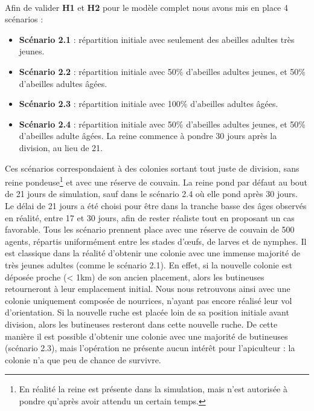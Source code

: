 			\paragraph{}
			
			Afin de valider \textbf{H1} et \textbf{H2} pour le modèle complet nous avons mis en place 4 scénarios :			
			\begin{itemize}
					\item \textbf{Scénario 2.1} : répartition initiale avec seulement des abeilles adultes très jeunes.
					\item \textbf{Scénario 2.2} : répartition initiale avec 50\% d'abeilles adultes jeunes, et 50\% d'abeilles adultes âgées.
					\item \textbf{Scénario 2.3} : répartition initiale avec 100\% d'abeilles adultes âgées.
					\item \textbf{Scénario 2.4} : répartition initiale avec 50\% d'abeilles adultes jeunes, et 50\% d'abeilles adulte âgées. La reine commence à pondre 30 jours après la division, au lieu de 21.
			\end{itemize}
			
			Ces scénarios correspondaient à des colonies sortant tout juste de division, sans reine pondeuse\footnote{En réalité la reine est présente dans la simulation, mais n'est autorisée à pondre qu'après avoir attendu un certain temps.} et avec une réserve de couvain. La reine pond par défaut au bout de 21 jours de simulation, sauf dans le scénario 2.4 où elle pond après 30 jours. Le délai de 21 jours a été choisi pour être dans la tranche basse des âges observés en réalité, entre 17 et 30 jours, afin de rester réaliste tout en proposant un cas favorable. Tous les scénario prennent place avec une réserve de couvain de 500 agents, répartis uniformément entre les stades d'œufs, de larves et de nymphes. Il est classique dans la réalité d'obtenir une colonie avec une immense majorité de très jeunes adultes (comme le scénario 2.1). En effet, si la nouvelle colonie est déposée proche (< 1km) de son ancien placement, alors les butineuses retourneront à leur emplacement initial. Nous nous retrouvons ainsi avec une colonie uniquement composée de nourrices, n'ayant pas encore réalisé leur vol d'orientation. Si la nouvelle ruche est placée loin de sa position initiale avant division, alors les butineuses resteront dans cette nouvelle ruche. De cette manière il est possible d'obtenir une colonie avec une majorité de butineuses (scénario 2.3), mais l'opération ne présente aucun intérêt pour l'apiculteur : la colonie n'a que peu de chance de survivre.
			
